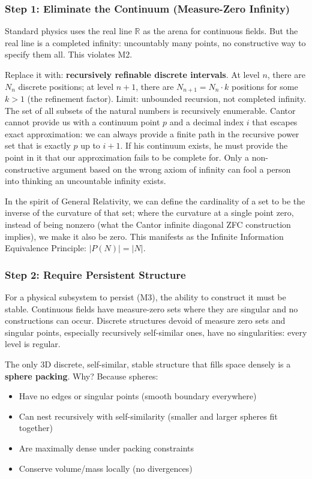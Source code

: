 \documentclass[11pt,a4paper]{article}
\begin{document}
\subsubsection{Step 1: Eliminate the Continuum (Measure-Zero Infinity)}

Standard physics uses the real line $\mathbb{R}$ as the arena for continuous fields. But the real line is a completed infinity: uncountably many points, no constructive way to specify them all. This violates M2.

Replace it with: \textbf{recursively refinable discrete intervals}. At level $n$, there are $N_n$ discrete positions; at level $n+1$, there are $N_{n+1} = N_n \cdot k$ positions for some $k > 1$ (the refinement factor). Limit: unbounded recursion, not completed infinity. The set of all subsets of the natural numbers is recursively enumerable. Cantor cannot provide us with a continuum point $p$ and a decimal index $i$ that escapes exact approximation: we can always provide a finite path in the recursive power set that is exactly $p$ up to $i+1$. If his continuum exists, he must provide the point in it that our approximation fails to be complete for. Only a non-constructive argument based on the wrong axiom of infinity can fool a person into thinking an uncountable infinity exists. 

In the spirit of General Relativity, we can define the cardinality of a set to be the inverse of the curvature of that set; where the curvature at a single point zero, instead of being nonzero (what the Cantor infinite diagonal ZFC construction implies), we make it also be zero. This manifests as the Infinite Information Equivalence Principle: $|P(N)| = |N|$.

\subsubsection{Step 2: Require Persistent Structure}

For a physical subsystem to persist (M3), the ability to construct it must be stable. Continuous fields have measure-zero sets where they are singular and no constructions can occur. Discrete structures devoid of measure zero sets and singular points, especially recursively self-similar ones, have no singularities: every level is regular. 

The only 3D discrete, self-similar, stable structure that fills space densely is a \textbf{sphere packing}. Why? Because spheres:
\begin{itemize}
\item Have no edges or singular points (smooth boundary everywhere)
\item Can nest recursively with self-similarity (smaller and larger spheres fit together)
\item Are maximally dense under packing constraints
\item Conserve volume/mass locally (no divergences)
\end{itemize}
\end{document}
